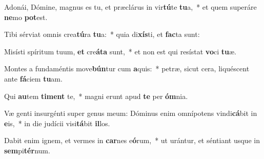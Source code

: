 \item Adonái, Dómine, magnus es tu, et præclárus in vir\textbf{tú}te \textbf{tu}a,~* et quem superáre \textbf{ne}mo \textbf{pot}est.
\item Tibi sérviat omnis crea\textbf{tú}ra \textbf{tu}a:~* quia di\textbf{xís}ti, et \textbf{fac}ta sunt:
\item Misísti spíritum tuum, \textbf{et} cre\textbf{á}\textbf{ta} sunt,~* et non est qui resístat \textbf{vo}ci \textbf{tu}æ.
\item Montes a fundaméntis move\textbf{bún}tur cum \textbf{a}quis:~* petræ, sicut cera, liquéscent ante \textbf{fá}ciem \textbf{tu}am.
\item Qui \textbf{au}tem \textbf{ti}\textbf{ment} te,~* magni erunt apud \textbf{te} per \textbf{óm}nia.
\item Væ genti insurgénti super genus meum: Dóminus enim omnípotens vindi\textbf{cá}bit in \textbf{e}is,~* in die judícii visi\textbf{tá}bit \textbf{il}los.
\item Dabit enim ignem, et vermes in \textbf{car}nes e\textbf{ó}rum,~* ut urántur, et séntiant usque in \textbf{sem}pi\textbf{tér}num.

